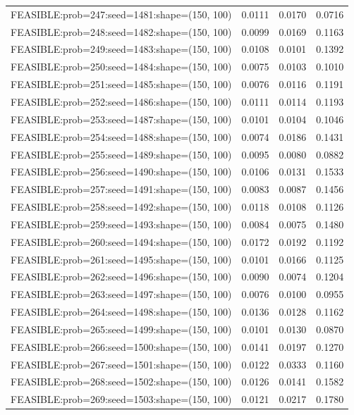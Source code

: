 \begin{longtable}{lccc}
FEASIBLE:prob=247:seed=1481:shape=(150, 100) & 0.0111 & 0.0170 & 0.0716 \\
FEASIBLE:prob=248:seed=1482:shape=(150, 100) & 0.0099 & 0.0169 & 0.1163 \\
FEASIBLE:prob=249:seed=1483:shape=(150, 100) & 0.0108 & 0.0101 & 0.1392 \\
FEASIBLE:prob=250:seed=1484:shape=(150, 100) & 0.0075 & 0.0103 & 0.1010 \\
FEASIBLE:prob=251:seed=1485:shape=(150, 100) & 0.0076 & 0.0116 & 0.1191 \\
FEASIBLE:prob=252:seed=1486:shape=(150, 100) & 0.0111 & 0.0114 & 0.1193 \\
FEASIBLE:prob=253:seed=1487:shape=(150, 100) & 0.0101 & 0.0104 & 0.1046 \\
FEASIBLE:prob=254:seed=1488:shape=(150, 100) & 0.0074 & 0.0186 & 0.1431 \\
FEASIBLE:prob=255:seed=1489:shape=(150, 100) & 0.0095 & 0.0080 & 0.0882 \\
FEASIBLE:prob=256:seed=1490:shape=(150, 100) & 0.0106 & 0.0131 & 0.1533 \\
FEASIBLE:prob=257:seed=1491:shape=(150, 100) & 0.0083 & 0.0087 & 0.1456 \\
FEASIBLE:prob=258:seed=1492:shape=(150, 100) & 0.0118 & 0.0108 & 0.1126 \\
FEASIBLE:prob=259:seed=1493:shape=(150, 100) & 0.0084 & 0.0075 & 0.1480 \\
FEASIBLE:prob=260:seed=1494:shape=(150, 100) & 0.0172 & 0.0192 & 0.1192 \\
FEASIBLE:prob=261:seed=1495:shape=(150, 100) & 0.0101 & 0.0166 & 0.1125 \\
FEASIBLE:prob=262:seed=1496:shape=(150, 100) & 0.0090 & 0.0074 & 0.1204 \\
FEASIBLE:prob=263:seed=1497:shape=(150, 100) & 0.0076 & 0.0100 & 0.0955 \\
FEASIBLE:prob=264:seed=1498:shape=(150, 100) & 0.0136 & 0.0128 & 0.1162 \\
FEASIBLE:prob=265:seed=1499:shape=(150, 100) & 0.0101 & 0.0130 & 0.0870 \\
FEASIBLE:prob=266:seed=1500:shape=(150, 100) & 0.0141 & 0.0197 & 0.1270 \\
FEASIBLE:prob=267:seed=1501:shape=(150, 100) & 0.0122 & 0.0333 & 0.1160 \\
FEASIBLE:prob=268:seed=1502:shape=(150, 100) & 0.0126 & 0.0141 & 0.1582 \\
FEASIBLE:prob=269:seed=1503:shape=(150, 100) & 0.0121 & 0.0217 & 0.1780 \\

\end{longtable}
